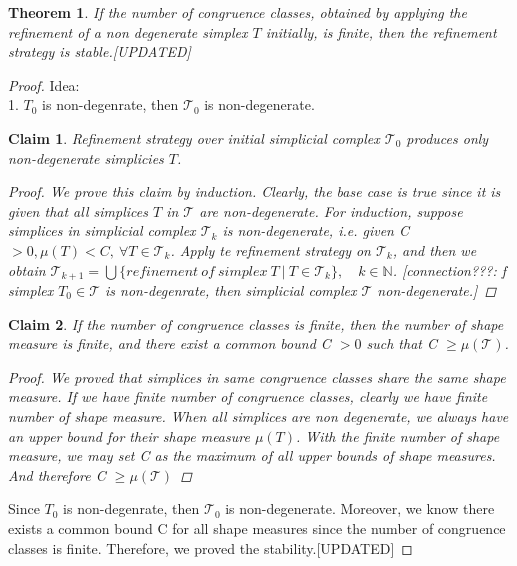 \documentclass{article}
\newtheorem*{theorem*}{Theorem}
\newtheorem*{claim*}{Claim}
\begin{document}
    \begin{theorem*}
    If the number of congruence classes, obtained by applying the refinement of a non degenerate simplex $T$ initially, is finite, then the refinement strategy is stable.[UPDATED]
    \end{theorem*}
    \begin{proof}
    Idea:\\
    1. $T_0$ is non-degenrate, then $\mathcal{T_0}$ is non-degenerate.\\
    \begin{claim*}
    Refinement strategy over initial simplicial complex $\mathcal{T_0}$ produces only non-degenerate simplicies $T$.
    \begin{proof}
    We prove this claim by induction.
    Clearly, the base case is true since it is given that all simplices $T$ in $\mathcal{T}$ are non-degenerate. For induction, suppose simplices in simplicial complex $\mathcal{T}_k$ is non-degenerate, i.e. given C $> 0, \mu(T) < C, ~\forall T \in\mathcal{T}_k$. Apply te refinement strategy on $\mathcal{T}_k$, and then we obtain $\mathcal{T}_{k+1} = \bigcup\{refinement~of~simplex~T ~\vert ~T\in\mathcal{T}_{k}\}, \quad k\in\mathbb{N}$. [connection???: f simplex $T_0 \in\mathcal{T}$ is non-degenrate, then simplicial complex $\mathcal{T}$ non-degenerate.]
    \end{proof}
    \end{claim*}

    \begin{claim*}
    If the number of congruence classes is finite, then the number of shape measure is finite, and there exist a common bound C $> 0$ such that C $\geq \mu(\mathcal{T})$.
    \begin{proof}
    We proved that simplices in same congruence classes share the same shape measure. If we have finite number of congruence classes, clearly we have finite number of shape measure. When all simplices are non degenerate, we always have an upper bound for their shape measure $\mu(T)$. With the finite number of shape measure, we may set C as the maximum of all upper bounds of shape measures. And therefore C $\geq \mu(\mathcal{T})$
    \end{proof}
    \end{claim*}

    Since $T_0$ is non-degenrate, then $\mathcal{T_0}$ is non-degenerate. Moreover, we know there exists a common bound C for all shape measures since the number of congruence classes is finite. Therefore, we proved the stability.[UPDATED]
    \end{proof}
\end{document}
